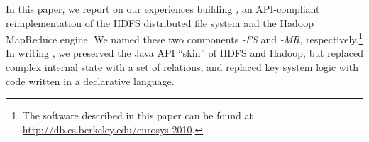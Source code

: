 In this paper, we report on our experiences building \emph{\BOOMA,} an
API-compliant reimplementation of the HDFS distributed file system and the
Hadoop MapReduce engine.  We named these two
components \emph{\BOOM-FS} and \emph{\BOOM-MR}, respectively.\footnote{The \BOOMA software described in this paper can be
  found at \url{http://db.cs.berkeley.edu/eurosys-2010}.} In writing \BOOMA,
we preserved the Java API ``skin'' of HDFS and Hadoop, but replaced complex
internal state with a set of relations, and replaced key system
logic with code written in a declarative language.

